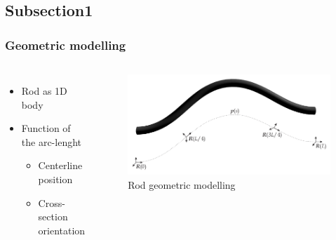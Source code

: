 \documentclass[compress]{thesisbeamer}
\begin{document}
        	\subsection{Subsection1}
        	\begin{frame}
        		\frametitle{Geometric modelling}
				\begin{columns}
				\begin{itemize}%
  					\item Rod as 1D body 
  					\item Function of the arc-lenght
  					\begin{itemize}%
   						\item Centerline position
   						\item Cross-section orientation
  					\end{itemize}
 				\end{itemize}
				\vspace{2cm}
				\begin{figure}[h]
					\centering
					\includegraphics[width=\textwidth]{images/rod_geometry}
					\caption{Rod geometric modelling}
				\end{figure}
				\end{columns}
			\end{frame}
\end{document}
